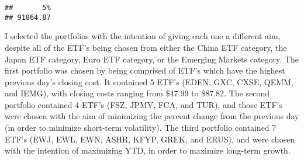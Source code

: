 \documentclass[]{article}
\begin{document}
\begin{verbatim}
##       5% 
## 91864.87
\end{verbatim}

I selected the portfolios with the intention of giving each one a
different aim, despite all of the ETF's being chosen from either the
China ETF category, the Japan ETF category, Euro ETF category, or the
Emerging Markets category. The first portfolio was chosen by being
comprised of ETF's which have the highest previous day's closing cost.
It contained 5 ETF's (EDEN, GXC, CXSE, QEMM, and IEMG), with closing
costs ranging from \$47.99 to \$87.82. The second portfolio contained 4
ETF's (FSZ, JPMV, FCA, and TUR), and those ETF's were chosen with the
aim of minimizing the percent change from the previous day (in order to
minimize short-term volatility). The third portfolio contained 7 ETF's
(EWJ, EWL, EWN, ASHR, KFYP, GREK, and ERUS), and were chosen with the
intention of maximizing YTD, in order to maximize long-term growth.
\end{document}
